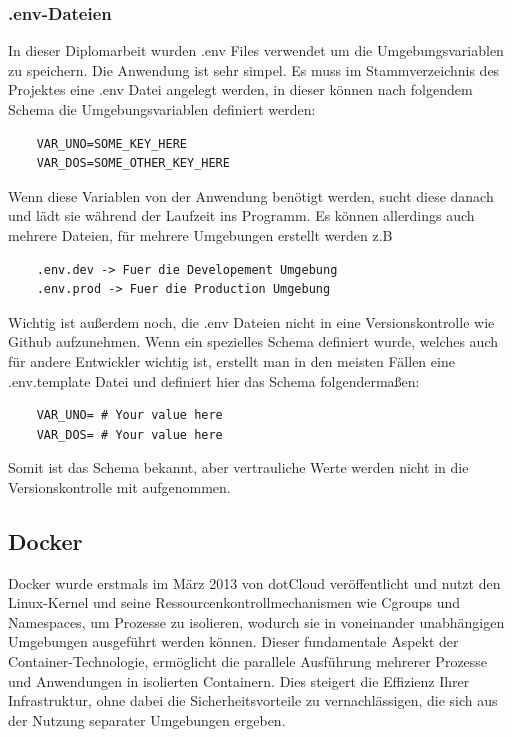 \subsubsection{.env-Dateien}
In dieser Diplomarbeit wurden .env Files verwendet um die Umgebungsvariablen zu speichern. Die Anwendung ist sehr simpel. Es muss im Stammverzeichnis des Projektes eine .env Datei angelegt werden, in dieser können nach folgendem Schema die Umgebungsvariablen definiert werden:
\begin{verbatim}
    VAR_UNO=SOME_KEY_HERE
    VAR_DOS=SOME_OTHER_KEY_HERE
\end{verbatim}

Wenn diese Variablen von der Anwendung benötigt werden, sucht diese danach und lädt sie während der Laufzeit ins Programm. 
Es können allerdings auch mehrere Dateien, für mehrere Umgebungen erstellt werden z.B
\begin{verbatim}
    .env.dev -> Fuer die Developement Umgebung
    .env.prod -> Fuer die Production Umgebung
\end{verbatim}

Wichtig ist außerdem noch, die .env Dateien nicht in eine Versionskontrolle wie Github aufzunehmen. Wenn ein spezielles Schema definiert wurde, welches auch für andere Entwickler wichtig ist, erstellt man in den meisten Fällen eine .env.template Datei und definiert hier das Schema folgendermaßen:

\begin{verbatim}
    VAR_UNO= # Your value here
    VAR_DOS= # Your value here
\end{verbatim}

Somit ist das Schema bekannt, aber vertrauliche Werte werden nicht in die Versionskontrolle mit aufgenommen.


\cite{Umgebungsvariablen}




\subsection{Docker}

Docker wurde erstmals im März 2013 von dotCloud veröffentlicht und nutzt den Linux-Kernel und seine Ressourcenkontrollmechanismen wie Cgroups und Namespaces, um Prozesse zu isolieren, wodurch sie in voneinander unabhängigen Umgebungen ausgeführt werden können. Dieser fundamentale Aspekt der Container-Technologie, ermöglicht die parallele Ausführung mehrerer Prozesse und Anwendungen in isolierten Containern. Dies steigert die Effizienz Ihrer Infrastruktur, ohne dabei die Sicherheitsvorteile zu vernachlässigen, die sich aus der Nutzung separater Umgebungen ergeben.

